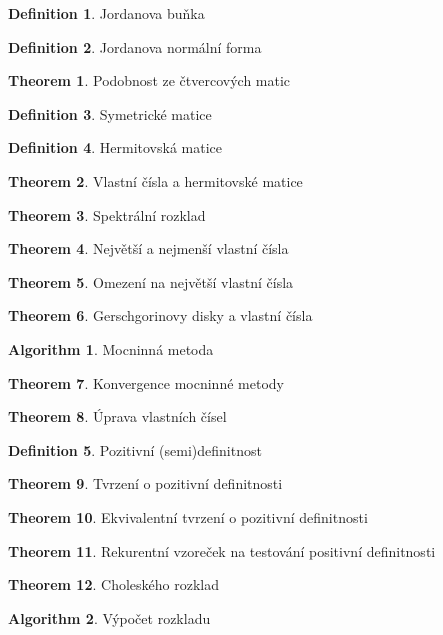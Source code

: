 \documentclass[a4paper]{article}
\theoremstyle{definition}
\newtheorem{definition}{Definition}
\newtheorem{theorem}{Theorem}
\newtheorem{algorithm}{Algorithm}
\begin{document}
\begin{definition}{Jordanova buňka} \end{definition}
\begin{definition}{Jordanova normální forma} \end{definition}
\begin{theorem}{Podobnost ze čtvercových matic} \end{theorem}
\begin{definition}{Symetrické matice} \end{definition}
\begin{definition}{Hermitovská matice} \end{definition}
\begin{theorem}{Vlastní čísla a hermitovské matice} \end{theorem}
\begin{theorem}{Spektrální rozklad} \end{theorem}
\begin{theorem}{Největší a nejmenší vlastní čísla} \end{theorem}
\begin{theorem}{Omezení na největší vlastní čísla} \end{theorem}
\begin{theorem}{Gerschgorinovy disky a vlastní čísla} \end{theorem}
\begin{algorithm}{Mocninná metoda} \end{algorithm}
\begin{theorem}{Konvergence mocninné metody} \end{theorem}
\begin{theorem}{Úprava vlastních čísel} \end{theorem}
\begin{definition}{Pozitivní (semi)definitnost} \end{definition}
\begin{theorem}{Tvrzení o pozitivní definitnosti} \end{theorem}
\begin{theorem}{Ekvivalentní tvrzení o pozitivní definitnosti} \end{theorem}
\begin{theorem}{Rekurentní vzoreček na testování positivní definitnosti} \end{theorem}
\begin{theorem}{Choleského rozklad} \end{theorem}
\begin{algorithm}{Výpočet rozkladu} \end{algorithm}
\end{document}
